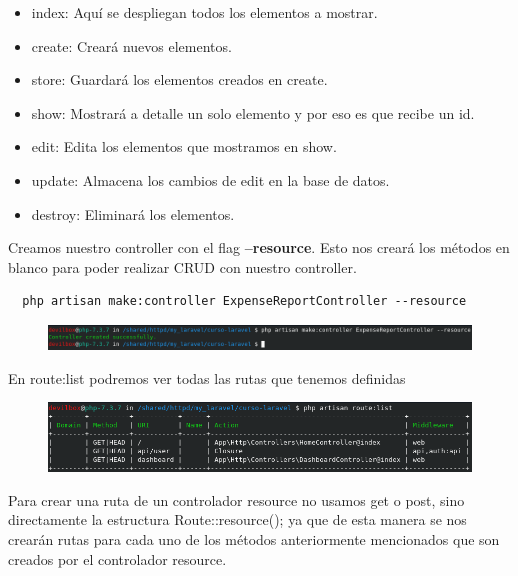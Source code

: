 \documentclass{article}
\begin{document}
\begin{itemize}
  \item index: Aquí se despliegan todos los elementos a mostrar.
  \item create: Creará nuevos elementos.
  \item store: Guardará los elementos creados en create.
  \item show: Mostrará a detalle un solo elemento y por eso es que recibe un id.
  \item edit: Edita los elementos que mostramos en show.
  \item update: Almacena los cambios de edit en la base de datos.
  \item destroy: Eliminará los elementos.
\end{itemize}

Creamos nuestro controller con el flag \textbf{--resource}. Esto nos creará los
métodos en blanco para poder realizar CRUD con nuestro controller.\\

\begin{verbatim}
  php artisan make:controller ExpenseReportController --resource
\end{verbatim}

\begin{figure}[h!]
  \centering
  \includegraphics[scale=0.6]{./Pictures/049_controller_resource.png}
\end{figure}

En route:list podremos ver todas las rutas que tenemos definidas\\

\begin{figure}[h!]
  \centering
  \includegraphics[scale=0.75]{./Pictures/050_route_list.png}
\end{figure}

Para crear una ruta de un controlador resource no usamos get o post, sino
directamente la estructura Route::resource(); ya que de esta manera se nos
crearán rutas para cada uno de los métodos anteriormente mencionados que son
creados por el controlador resource.
\end{document}
